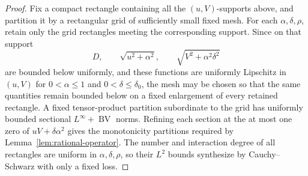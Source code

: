 \documentclass[11pt]{article}
\numberwithin{equation}{section}
\theoremstyle{remark}
\theoremstyle{definition}
\newcommand{\BV}{\operatorname{BV}}
\begin{document}
\begin{proof}
Fix a compact rectangle containing all the $(u,V)$-supports above, and
partition it by a rectangular grid of sufficiently small fixed mesh.  For
each $\alpha,\delta,\rho$, retain only the grid rectangles meeting the
corresponding support.  Since on that support
\[
 D,\qquad \sqrt{u^2+\alpha^2},\qquad
 \sqrt{V^2+\alpha^2\delta^2}
\]
are bounded below uniformly, and these functions are uniformly Lipschitz
in $(u,V)$ for $0<\alpha\le1$ and $0<\delta\le\delta_0$, the mesh may
be chosen so that the same quantities remain bounded below on a fixed
enlargement of every retained rectangle.  A fixed tensor-product
partition subordinate to the grid has uniformly bounded sectional
$L^\infty+\BV$ norms.  Refining each section at the at most one zero of
$uV+\delta\alpha^2$ gives the monotonicity partitions required by
Lemma~\ref{lem:rational-operator}.  The number and interaction degree of
all rectangles are uniform in $\alpha,\delta,\rho$, so their $L^2$
bounds synthesize by Cauchy--Schwarz with only a fixed loss.


\end{proof}
\end{document}

